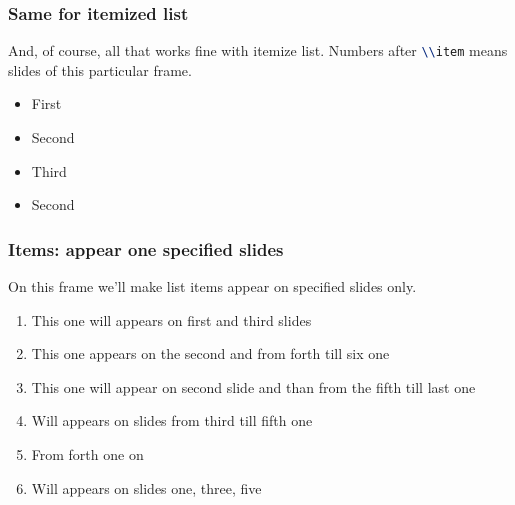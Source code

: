 \begin{frame}
    \frametitle{Same for itemized list}
    And, of course, all that works fine with itemize list. Numbers after \lstinline[language=tex]{\\item} means slides of this particular frame.
    \begin{itemize}
	\item<1-> First
	\item<2-> Second
	\item<3-> Third
	\item<2-> Second
    \end{itemize}
\end{frame}

\begin{frame}
    \frametitle{Items: appear one specified slides}
    On this frame we'll make list items appear on specified slides only. 
    \begin{enumerate}
	\item<1,3> This one will appears on first and third slides
	\item<2,4-6> This one appears on the second and from forth till six one
	\item<2,5-> This one will appear on second slide and than from the fifth till last one
	\item<3-5> Will appears on slides from third till fifth one
	\item<4-> From forth one on
	\item<1,3,5> Will appears on slides one, three, five
    \end{enumerate}
\end{frame}


